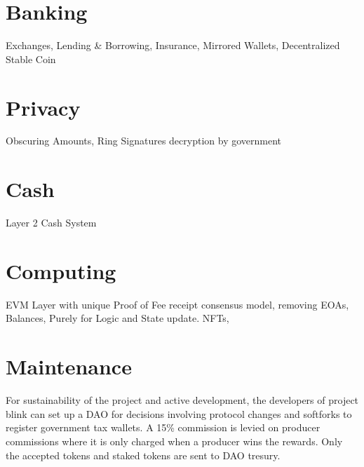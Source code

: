 \documentclass[a4paper,10pt]{article}
\begin{document}
\section{Banking}
Exchanges, Lending \& Borrowing, Insurance, Mirrored Wallets, Decentralized Stable Coin
\section{Privacy}
Obscuring Amounts, Ring Signatures decryption by government
\section{Cash}
Layer 2 Cash System 
\section{Computing}
EVM Layer with unique Proof of Fee receipt consensus model, removing EOAs, Balances, Purely for Logic and State update. NFTs, 
\section{Maintenance}
For sustainability of the project and active development, the developers of project blink can set up a DAO for decisions involving protocol changes and softforks to register government tax wallets. A 15\% commission is levied on producer commissions where it is only charged when a producer wins the rewards. Only the accepted tokens and staked tokens are sent to DAO tresury.

\appendix
\end{document}
